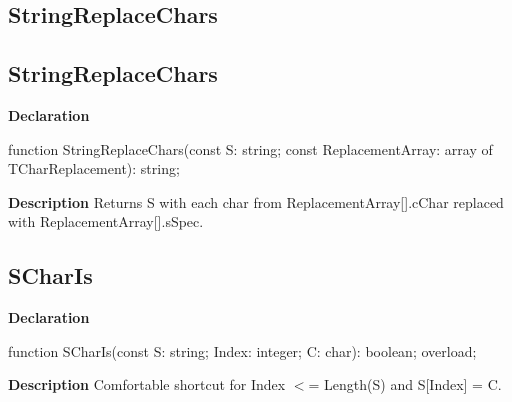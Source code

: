 \documentclass{report}
\newif\ifpdf
\begin{document}
\subsection*{\large{\textbf{StringReplaceChars}}\normalsize\hspace{1ex}\hrulefill}
\else
\subsection*{StringReplaceChars}
\fi
\label{PasDoc_Utils-StringReplaceChars}
\begin{list}{}{
\setlength{\itemindent}{0cm}
\setlength{\listparindent}{0cm}
\setlength{\leftmargin}{\evensidemargin}
\addtolength{\leftmargin}{\tmplength}
\settowidth{\labelsep}{X}
\addtolength{\leftmargin}{\labelsep}
\setlength{\labelwidth}{\tmplength}
}
\item[\textbf{Declaration}\hfill]
\ifpdf
\begin{flushleft}
\fi
\begin{ttfamily}
function StringReplaceChars(const S: string; const ReplacementArray: array of TCharReplacement): string;\end{ttfamily}

\ifpdf
\end{flushleft}
\fi

\par
\item[\textbf{Description}]
Returns S with each char from ReplacementArray[].cChar replaced with ReplacementArray[].sSpec.

\end{list}
\ifpdf
\subsection*{\large{\textbf{SCharIs}}\normalsize\hspace{1ex}\hrulefill}
\else
\subsection*{SCharIs}
\fi
\label{PasDoc_Utils-SCharIs}
\begin{list}{}{
\setlength{\itemindent}{0cm}
\setlength{\listparindent}{0cm}
\setlength{\leftmargin}{\evensidemargin}
\addtolength{\leftmargin}{\tmplength}
\settowidth{\labelsep}{X}
\addtolength{\leftmargin}{\labelsep}
\setlength{\labelwidth}{\tmplength}
}
\item[\textbf{Declaration}\hfill]
\ifpdf
\begin{flushleft}
\fi
\begin{ttfamily}
function SCharIs(const S: string; Index: integer; C: char): boolean; overload;\end{ttfamily}

\ifpdf
\end{flushleft}
\fi

\par
\item[\textbf{Description}]
Comfortable shortcut for Index {$<$}= Length(S) and S[Index] = C.

\end{list}
\ifpdf
\end{document}
